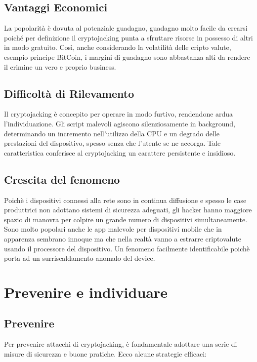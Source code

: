 \documentclass[12pt,a4paper]{article}
\begin{document}
\subsection{Vantaggi Economici}
La popolarità è dovuta al potenziale guadagno, guadagno molto facile da crearsi
poiché per definizione il cryptojacking punta a sfruttare risorse in possesso
di altri in modo gratuito. Così, anche considerando la volatilità delle cripto
valute, esempio principe BitCoin, i margini di guadagno sono abbastanza alti da
rendere il crimine un vero e proprio business. 

\subsection{Difficoltà di Rilevamento}
Il cryptojacking è concepito per operare in modo furtivo, rendendone ardua
l'individuazione. Gli script malevoli agiscono silenziosamente in background,
determinando un incremento nell'utilizzo della CPU e un degrado delle
prestazioni del dispositivo, spesso senza che l'utente se ne accorga. Tale
caratteristica conferisce al cryptojacking un carattere persistente e insidioso.

\subsection{Crescita del fenomeno}
Poichè i dispositivi connessi alla rete sono in continua diffusione e spesso le
case produttrici non adottano sistemi di sicurezza adeguati, gli hacker hanno
maggiore spazio di manovra per colpire un grande numero di dispositivi
simultaneamente. Sono molto popolari anche le app malevole per dispositivi
mobile che in apparenza sembrano innoque ma che nella realtà vanno a estrarre
criptovalute usando il processore del dispositivo. Un fenomeno facilmente
identificabile poichè porta ad un surriscaldamento anomalo del device.

\newpage

\section{Prevenire e individuare}

\subsection{Prevenire}
Per prevenire attacchi di cryptojacking, è fondamentale adottare una serie di
misure di sicurezza e buone pratiche. Ecco alcune strategie efficaci:
\end{document}
